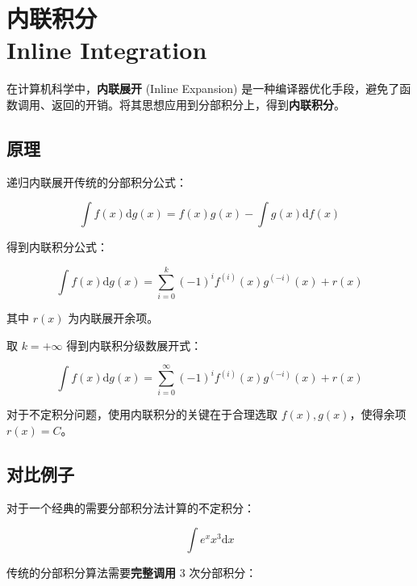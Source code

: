 \chapter[内联积分]{内联积分 \\ Inline Integration}

在计算机科学中，\textbf{内联展开} (Inline Expansion) 是一种编译器优化手段，避免了函数调用、返回的开销。将其思想应用到分部积分上，得到\textbf{内联积分}。

\section{原理}
递归内联展开传统的分部积分公式：

\begin{equation}
    \int {f(x) \mathrm{d} g(x)} = f(x) g(x) - \int {g(x) \mathrm{d} f(x)}
\end{equation}

得到内联积分公式：

\begin{equation}
    \int {f(x) \mathrm{d} g(x)} = \sum_{i = 0}^{k}{(-1)^{i} f^{(i)}(x) g^{(-i)}(x)} + r(x)
\end{equation}

其中 $r(x)$ 为内联展开余项。

取 $k = +\infty$ 得到内联积分级数展开式：

\begin{equation}
    \int {f(x) \mathrm{d} g(x)} = \sum_{i = 0}^{\infty}{(-1)^{i} f^{(i)}(x) g^{(-i)}(x)} + r(x)
\end{equation}

对于不定积分问题，使用内联积分的关键在于合理选取 $f(x), g(x)$，使得余项 $r(x) = C$。


\section{对比例子}

对于一个经典的需要分部积分法计算的不定积分：

$$
\int {e^x x^3 \mathrm{d}x}
$$

传统的分部积分算法需要\textbf{完整调用} 3 次分部积分：

